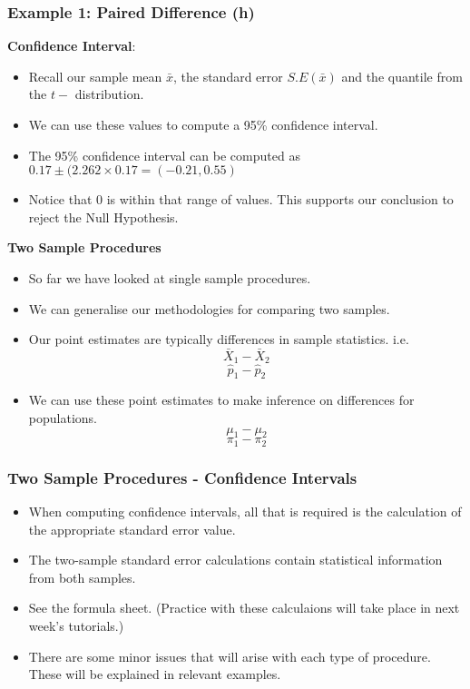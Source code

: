 \documentclass[a4]{beamer}
\begin{document}
\begin{frame}
\frametitle{Example 1: Paired Difference (h)}
\textbf{Confidence Interval}:
\begin{itemize}
\item Recall our sample mean $\bar{x}$, the standard error $S.E(\bar{x})$ and the quantile from the $t-$ distribution.
\item We can use these values to compute a 95\% confidence interval.
\item The 95\% confidence interval can be computed as $0.17 \pm (2.262 \times 0.17 = (-0.21,0.55)$
\item Notice that 0 is within that range of values. This supports our conclusion to reject the Null Hypothesis.
\end{itemize}
\end{frame}
\begin{frame}
\textbf{Two Sample Procedures}
\begin{itemize}
\item So far we have looked at single sample procedures.
\item We can generalise our methodologies for comparing two samples.
\item Our point estimates are typically differences in sample statistics. i.e.
\[ \bar{X}_1 - \bar{X}_2\]
\[\hat{p}_1 - \hat{p}_2 \]
\item We can use these point estimates to make inference on differences for populations.
\[ \mu_1 - \mu_2\]
\[ \pi_1 - \pi_2 \]
\end{itemize}
\end{frame}
\begin{frame}
\frametitle{Two Sample Procedures - Confidence Intervals}
\begin{itemize}
\item When computing confidence intervals, all that is required is the calculation of the appropriate standard error value.
\item The two-sample standard error calculations contain statistical information from both samples.
\item See the formula sheet. (Practice with these calculaions will take place in next week's tutorials.)
\item There are some minor issues that will arise with each type of procedure. These will be explained in relevant examples.
\end{itemize}
\end{frame}
\end{document}
